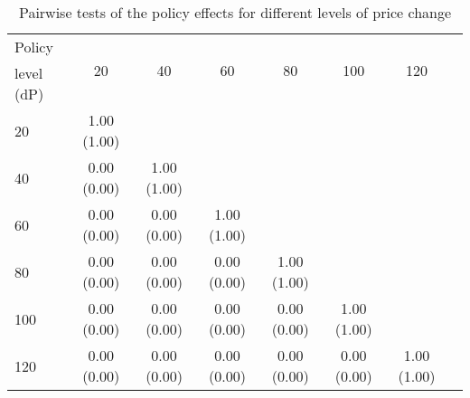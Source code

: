 
    \begin{table}[!h]
    \caption{Pairwise tests of the policy effects for different levels of price change}
    \label{table:ctrf-posteriorPrice-tests}
    \begin{center}
    \begin{tabular}{lccccccc}
    Policy & \multirow{2}{*}{20} & \multirow{2}{*}{40}&\multirow{2}{*}{60}&\multirow{2}{*}{80}&\multirow{2}{*}{100}&\multirow{2}{*}{120} \\
    level (dP)&  \\ \hline \hline
    20           & 1.00 (1.00) \\ 
40           & 0.00 (0.00) & 1.00 (1.00) \\ 
60           & 0.00 (0.00) & 0.00 (0.00) & 1.00 (1.00) \\ 
80           & 0.00 (0.00) & 0.00 (0.00) & 0.00 (0.00) & 1.00 (1.00) \\ 
100          & 0.00 (0.00) & 0.00 (0.00) & 0.00 (0.00) & 0.00 (0.00) & 1.00 (1.00) \\ 
120          & 0.00 (0.00) & 0.00 (0.00) & 0.00 (0.00) & 0.00 (0.00) & 0.00 (0.00) & 1.00 (1.00) \\ 

    \hline
    \end{tabular}
    \end{center}
     
    \end{table}
    